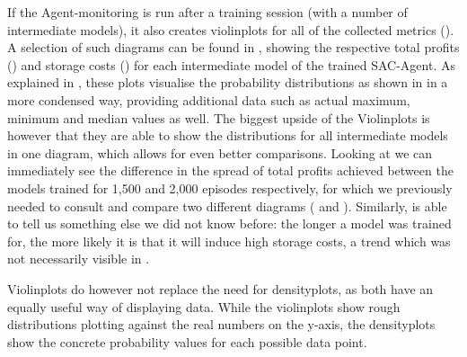 If the Agent-monitoring is run after a training session (with a number of intermediate models), it also creates violinplots for all of the collected metrics (). A selection of such diagrams can be found in , showing the respective total profits () and storage costs () for each intermediate model of the trained SAC-Agent. As explained in , these plots visualise the probability distributions as shown in  in a more condensed way, providing additional data such as actual maximum, minimum and median values as well. The biggest upside of the Violinplots is however that they are able to show the distributions for all intermediate models in one diagram, which allows for even better comparisons. Looking at  we can immediately see the difference in the spread of total profits achieved between the models trained for 1,500 and 2,000 episodes respectively, for which we previously needed to consult and compare two different diagrams ( and ). Similarly,  is able to tell us something else we did not know before: the longer a model was trained for, the more likely it is that it will induce high storage costs, a trend which was not necessarily visible in .

Violinplots do however not replace the need for densityplots, as both have an equally useful way of displaying data. While the violinplots show rough distributions plotting against the real numbers on the y-axis, the densityplots show the concrete probability values for each possible data point.


